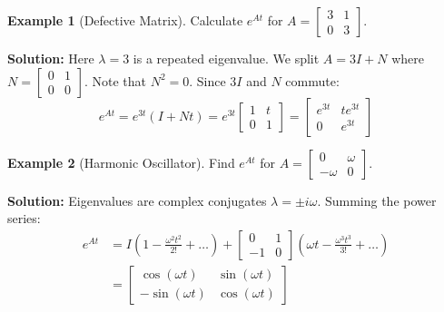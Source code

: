 \documentclass[12pt,a4paper,oneside]{article}
\theoremstyle{definition}
\newtheorem{example}{Example}[section]
\theoremstyle{plain}
\begin{document}
\begin{example}[Defective Matrix]
Calculate $e^{At}$ for $A = \begin{bmatrix} 3 & 1 \\ 0 & 3 \end{bmatrix}$.

\textbf{Solution:}
Here $\lambda = 3$ is a repeated eigenvalue. We split $A = 3I + N$ where $N = \begin{bmatrix} 0 & 1 \\ 0 & 0 \end{bmatrix}$. Note that $N^2 = 0$.
Since $3I$ and $N$ commute:
\begin{equation}
    e^{At} = e^{3t} (I + Nt) = e^{3t} \begin{bmatrix} 1 & t \\ 0 & 1 \end{bmatrix} = \begin{bmatrix} e^{3t} & t e^{3t} \\ 0 & e^{3t} \end{bmatrix}
\end{equation}
\end{example}

\begin{example}[Harmonic Oscillator]
Find $e^{At}$ for $A = \begin{bmatrix} 0 & \omega \\ -\omega & 0 \end{bmatrix}$.

\textbf{Solution:}
Eigenvalues are complex conjugates $\lambda = \pm i \omega$. Summing the power series:
\begin{align}
    e^{At} &= I \left( 1 - \frac{\omega^2 t^2}{2!} + \dots \right) + \begin{bmatrix} 0 & 1 \\ -1 & 0 \end{bmatrix} \left( \omega t - \frac{\omega^3 t^3}{3!} + \dots \right) \nonumber \\
    &= \begin{bmatrix} \cos(\omega t) & \sin(\omega t) \\ -\sin(\omega t) & \cos(\omega t) \end{bmatrix}
\end{align}
\end{example}
\end{document}
